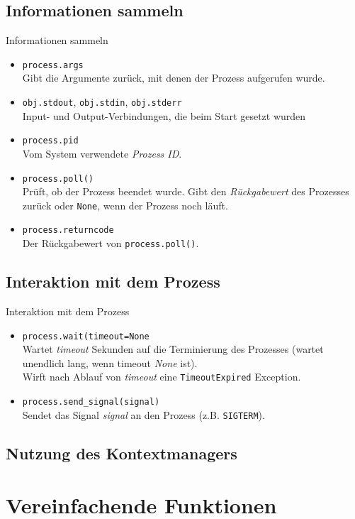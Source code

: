 \subsection{Informationen sammeln}
\begin{frame}[fragile]{Informationen sammeln}
	\begin{itemize}
		\item \texttt{process.args} \\
			Gibt die Argumente zur\"uck, mit denen der Prozess aufgerufen wurde.
		\item \texttt{obj.stdout}, \texttt{obj.stdin}, \texttt{obj.stderr} \\
			Input- und Output-Verbindungen, die beim Start gesetzt wurden
		\item \texttt{process.pid} \\
			Vom System verwendete \textit{Prozess ID}.
		\item \texttt{process.poll()} \\
			Pr\"uft, ob der Prozess beendet wurde. Gibt den \textit{R\"uckgabewert}
			des Prozesses zur\"uck oder \texttt{None}, wenn der Prozess noch l\"auft.
		\item \texttt{process.returncode} \\
			Der R\"uckgabewert von \texttt{process.poll()}.
	\end{itemize}
\end{frame}

\subsection{Interaktion mit dem Prozess}
\begin{frame}[fragile]{Interaktion mit dem Prozess}
	\begin{itemize}
		\item \texttt{process.wait(timeout=None} \\
			Wartet \textit{timeout} Sekunden auf die Terminierung des Prozesses
			(wartet unendlich lang, wenn timeout \textit{None} ist). \\
			Wirft nach Ablauf von \textit{timeout} eine \texttt{TimeoutExpired} Exception.
		\item \texttt{process.send\_signal(signal)} \\
			Sendet das Signal \textit{signal} an den Prozess (z.B. \texttt{SIGTERM}).
	\end{itemize}
\end{frame}


\subsection{Nutzung des Kontextmanagers}

\section{Vereinfachende Funktionen}


